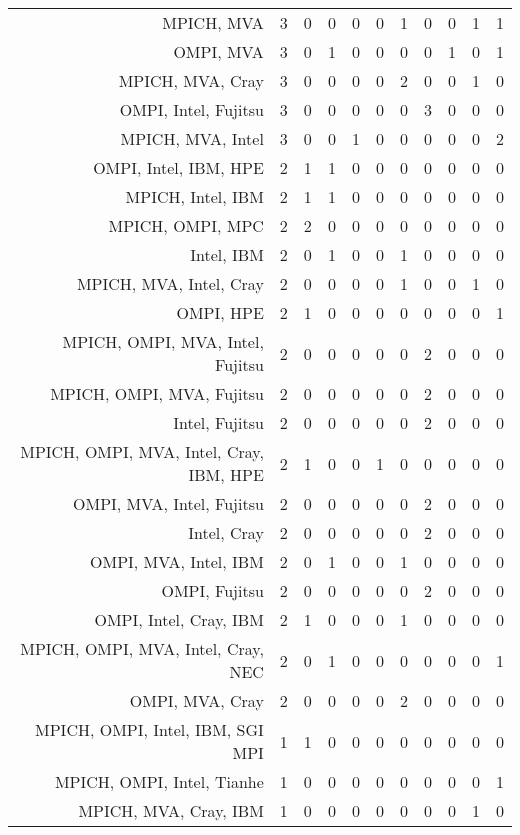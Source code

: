 {\begin{landscape}
\begin{longtable}[htb]{r|c|c|c|c|c|c|c|c|c|c}
{MPICH, MVA} & 3 & 0 & 0 & 0 & 0 & 1 & 0 & 0 & 1 & 1 \\%
{OMPI, MVA} & 3 & 0 & 1 & 0 & 0 & 0 & 0 & 1 & 0 & 1 \\%
{MPICH, MVA, Cray} & 3 & 0 & 0 & 0 & 0 & 2 & 0 & 0 & 1 & 0 \\%
{OMPI, Intel, Fujitsu} & 3 & 0 & 0 & 0 & 0 & 0 & 3 & 0 & 0 & 0 \\%
{MPICH, MVA, Intel} & 3 & 0 & 0 & 1 & 0 & 0 & 0 & 0 & 0 & 2 \\%
{OMPI, Intel, IBM, HPE} & 2 & 1 & 1 & 0 & 0 & 0 & 0 & 0 & 0 & 0 \\%
{MPICH, Intel, IBM} & 2 & 1 & 1 & 0 & 0 & 0 & 0 & 0 & 0 & 0 \\%
{MPICH, OMPI, MPC} & 2 & 2 & 0 & 0 & 0 & 0 & 0 & 0 & 0 & 0 \\%
{Intel, IBM} & 2 & 0 & 1 & 0 & 0 & 1 & 0 & 0 & 0 & 0 \\%
{MPICH, MVA, Intel, Cray} & 2 & 0 & 0 & 0 & 0 & 1 & 0 & 0 & 1 & 0 \\%
{OMPI, HPE} & 2 & 1 & 0 & 0 & 0 & 0 & 0 & 0 & 0 & 1 \\%
{MPICH, OMPI, MVA, Intel, Fujitsu} & 2 & 0 & 0 & 0 & 0 & 0 & 2 & 0 & 0 & 0 \\%
{MPICH, OMPI, MVA, Fujitsu} & 2 & 0 & 0 & 0 & 0 & 0 & 2 & 0 & 0 & 0 \\%
{Intel, Fujitsu} & 2 & 0 & 0 & 0 & 0 & 0 & 2 & 0 & 0 & 0 \\%
{MPICH, OMPI, MVA, Intel, Cray, IBM, HPE} & 2 & 1 & 0 & 0 & 1 & 0 & 0 & 0 & 0 & 0 \\%
{OMPI, MVA, Intel, Fujitsu} & 2 & 0 & 0 & 0 & 0 & 0 & 2 & 0 & 0 & 0 \\%
{Intel, Cray} & 2 & 0 & 0 & 0 & 0 & 0 & 2 & 0 & 0 & 0 \\%
{OMPI, MVA, Intel, IBM} & 2 & 0 & 1 & 0 & 0 & 1 & 0 & 0 & 0 & 0 \\%
{OMPI, Fujitsu} & 2 & 0 & 0 & 0 & 0 & 0 & 2 & 0 & 0 & 0 \\%
{OMPI, Intel, Cray, IBM} & 2 & 1 & 0 & 0 & 0 & 1 & 0 & 0 & 0 & 0 \\%
{MPICH, OMPI, MVA, Intel, Cray, NEC} & 2 & 0 & 1 & 0 & 0 & 0 & 0 & 0 & 0 & 1 \\%
{OMPI, MVA, Cray} & 2 & 0 & 0 & 0 & 0 & 2 & 0 & 0 & 0 & 0 \\%
{MPICH, OMPI, Intel, IBM, SGI MPI} & 1 & 1 & 0 & 0 & 0 & 0 & 0 & 0 & 0 & 0 \\%
{MPICH, OMPI, Intel, Tianhe} & 1 & 0 & 0 & 0 & 0 & 0 & 0 & 0 & 0 & 1 \\%
{MPICH, MVA, Cray, IBM} & 1 & 0 & 0 & 0 & 0 & 0 & 0 & 0 & 1 & 0 \\%

\end{longtable}
\end{landscape}}
